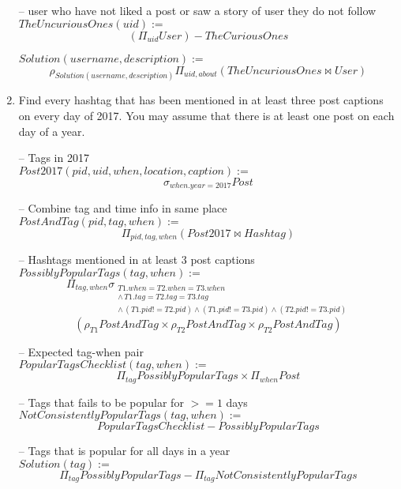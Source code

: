 \documentclass{article}
\newcommand{\var}[1]{\mathit{#1}}
\begin{document}
\begin{enumerate}
{-- user who have not liked a post or saw a story of user they do not follow\\ 
$\var{TheUncuriousOnes}(uid) :=$
\[
    (\Pi_{uid}\var{User}) - \var{TheCuriousOnes}
\]

$\var{Solution}(username, description) :=$
\[
    \rho_{Solution(username, description)}  \Pi_{uid, about} 
    (\var{TheUncuriousOnes} \bowtie \var{User})
\]

} %


\item   %
Find every hashtag that has been mentioned in at least three post captions
on every day of 2017.
You may assume that there is at least one post on each day of a year. 

{\large 



-- Tags in 2017 \\
$\var{Post2017}(pid, uid, when, location, caption) :=$
\[
    \sigma_{when.year=2017} Post
\]

-- Combine tag and time info in same place \\ 
$\var{PostAndTag}(pid, tag, when) :=$
\[
    \Pi_{pid, tag, when} (\var{Post2017} \bowtie \var{Hashtag})
\]

-- Hashtags mentioned in at least 3 post captions \\ 
$\var{PossiblyPopularTags}(tag, when) :=$
\[
    \Pi_{tag, when}
    \sigma_{
        \substack{T1.when=T2.when=T3.when \\ 
        \land\, T1.tag=T2.tag=T3.tag  \\
        \land\, (T1.pid != T2.pid) \land (T1.pid!= T3.pid)\land (T2.pid!=T3.pid) }}
\]
\[
    (\rho_{T1} \var{PostAndTag} \times \rho_{T2} \var{PostAndTag} \times \rho_{T2} \var{PostAndTag})
\]

-- Expected tag-when pair \\
$\var{PopularTagsChecklist}(tag, when) :=$
\[
    \Pi_{tag} \var{PossiblyPopularTags} \times \Pi_{when} \var{Post}
\]

-- Tags that fails to be popular for $>=1$ days  \\ 
$\var{NotConsistentlyPopularTags}(tag, when) :=$
\[
    PopularTagsChecklist - PossiblyPopularTags
\]

-- Tags that is popular for all days in a year \\
$\var{Solution}(tag) :=$
\[
    \Pi_{tag} \var{PossiblyPopularTags} - \Pi_{tag} \var{NotConsistentlyPopularTags}
\]


}



\end{enumerate}
\end{document}
